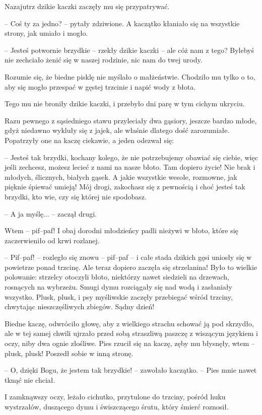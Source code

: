 \documentclass{book}
\begin{document}
Nazajutrz dzikie kaczki zaczęły mu się przypatrywać.

-- Coś ty za jedno? -- pytały zdziwione. A kaczątko kłaniało się na wszystkie strony, jak umiało i mogło.

-- Jesteś potwornie brzydkie -- rzekły dzikie kaczki -- ale cóż nam z tego? Bylebyś nie zechciało żenić się w naszej rodzinie, nic nam do twej urody.

Rozumie się, że biedne pisklę nie myślało o małżeństwie. Chodziło mu tylko o to, aby się mogło przespać w gęstej trzcinie i napić wody z błota.

Tego mu nie broniły dzikie kaczki, i przebyło dni parę w tym cichym ukryciu.

Razu pewnego z sąsiedniego stawu przyleciały dwa gąsiory, jeszcze bardzo młode, gdyż niedawno wykluły się z jajek, ale właśnie dlatego dość zarozumiałe. Popatrzyły one na kaczę ciekawie, a jeden odezwał się:

-- Jesteś tak brzydki, kochany kolego, że nie potrzebujemy obawiać się ciebie, więc jeśli zechcesz, możesz lecieć z nami na nasze błoto. Tam dopiero życie! Nie brak i młodych, ślicznych, białych gąsek. A jakie wszystkie wesołe, rozmowne, jak pięknie śpiewać umieją! Mój drogi, zakochasz się z pewnością i choć jesteś tak brzydki, kto wie, czy się której nie spodobasz.

-- A ja myślę... -- zaczął drugi.

Wtem -- pif–paf! I obaj dorodni młodzieńcy padli nieżywi w błoto, które się zaczerwieniło od krwi rozlanej.

-- Pif–paf! -- rozległo się znowu -- pif–paf -- i całe stada dzikich gęsi uniosły się w powietrze ponad trzcinę. Ale teraz dopiero zaczęła się strzelanina! Było to wielkie polowanie: strzelcy otoczyli błoto, niektórzy nawet siedzieli na drzewach, rosnących na wybrzeżu. Smugi dymu rozciągały się nad wodą i zasłaniały wszystko. Plusk, plusk, i psy myśliwskie zaczęły przebiegać wśród trzciny, chwytając nieszczęśliwych zbiegów. Sądny dzień!

Biedne kaczę, odwróciło głowę, aby z wielkiego strachu schować ją pod skrzydło, ale w tej samej chwili ujrzało przed sobą straszliwą paszczę z wiszącym językiem i oczy, niby dwa ognie złośliwe. Pies rzucił się na kaczę, zęby mu błysnęły, wtem -- plusk, plusk! Poszedł sobie w inną stronę.

-- O, dzięki Bogu, że jestem tak brzydkie! -- zawołało kaczątko. -- Pies mnie nawet tknąć nie chciał.

I zamknąwszy oczy, leżało cichutko, przytulone do trzciny, pośród huku wystrzałów, duszącego dymu i świszczącego śrutu, który śmierć roznosił.
\end{document}
